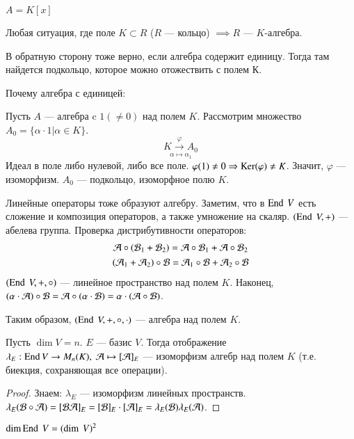 \documentclass[main]{subfiles}
\begin{document}
\begin{example}
    $A = K[x]$
\end{example}
\begin{example}
    Любая ситуация, где поле $K \subset R$ ($R$ —  кольцо) $\implies R$ — $K$-алгебра.

    В обратную сторону тоже верно, если алгебра содержит единицу. Тогда там найдется подкольцо, которое можно отожествить с полем К.

    Почему алгебра с единицей:

    Пусть $A$ —  алгебра c $1(\neq0)$ над полем $K$.
    Рассмотрим множество $A_0 = \{\alpha \cdot 1| \alpha \in K\}$.
     \[\underset{\alpha \mapsto \alpha_1}{K \xrightarrow{\varphi} A_0 }\]
    Идеал в  поле либо нулевой, либо все поле.
    $\varphi(1) \neq 0 \Rightarrow \operatorname{Ker}(\varphi)\neq K$.
    Значит,  $\varphi$ — изоморфизм. $A_0$ — подкольцо, изоморфное полю $K$.
\end{example}


Линейные операторы тоже образуют алгебру. Заметим, что в $\operatorname{End} \ V$ есть сложение и композиция операторов, а также умножение на скаляр.
$(\operatorname{End} \ V, +)$ — абелева группа. Проверка дистрибутивности операторов:
\begin{gather*}
    \mathcal{A}\circ(\mathcal{B}_1+\mathcal{B}_2) = \mathcal{A}\circ\mathcal{B}_1 + \mathcal{A}\circ\mathcal{B}_2 \\
    (\mathcal{A}_1 + \mathcal{A}_2)\circ\mathcal{B} = \mathcal{A}_1\circ\mathcal{B}+\mathcal{A}_2\circ\mathcal{B}
\end{gather*}
$(\operatorname{End} \ V, +, \circ)$ — линейное пространство над полем $K$. Наконец,
$(\alpha\cdot\mathcal{A})\circ\mathcal{B}=\mathcal{A}\circ(\alpha\cdot\mathcal{B})=\alpha\cdot(\mathcal{A}\circ\mathcal{B})$.

Таким образом, $(\operatorname{End} \ V, +, \circ, \cdot)$ — алгебра над полем $K$.




\begin{proposition}
    Пусть $\dim V = n$. $E$ — базис $V$.
    Тогда отображение $\lambda_E : \operatorname{End} V \rightarrow M_n(K), \ \mathcal{A} \mapsto [\mathcal{A}]_E$ — изоморфизм алгебр над полем $K$ (т.е. биекция, сохраняющая все операции).
\end{proposition}

\begin{proof}
    Знаем: $\lambda_E$ — изоморфизм линейных пространств. $\lambda_E(\mathcal{B}\circ\mathcal{A})=[\mathcal{B}\mathcal{A}]_E=[\mathcal{B}]_E\cdot[\mathcal{A}]_E = \lambda_E(\mathcal{B})\lambda_E(\mathcal{A})$.
\end{proof}

\begin{corollary}
    $\dim \operatorname{End}\ V = (\dim \ V)^2 $
\end{corollary}
\end{document}
